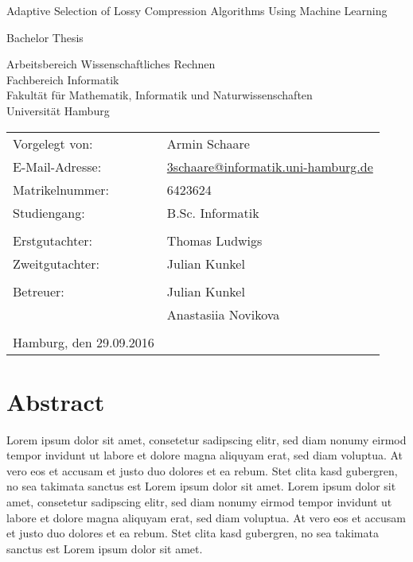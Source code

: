 \documentclass[
	12pt,
	a4paper,
	BCOR10mm,
	DIV14,
	headsepline,
]{scrreprt}
\begin{document}
\begin{titlepage}
	\begin{center}
		{\titlefont\huge Adaptive Selection of Lossy Compression Algorithms Using Machine Learning\par}

		\bigskip
		\bigskip

		{\Large Bachelor Thesis\par}

		\bigskip
		\bigskip

		{\large Arbeitsbereich Wissenschaftliches Rechnen\\
		Fachbereich Informatik\\
		Fakultät für Mathematik, Informatik und Naturwissenschaften\\
		Universität Hamburg\par}
	\end{center}

	\vfill

	{\large\begin{tabular}{ll}
		Vorgelegt von:  & Armin Schaare \\
		E-Mail-Adresse: & \href{mailto:3schaare@informatik.uni-hamburg.de}{3schaare@informatik.uni-hamburg.de} \\
		Matrikelnummer: & 6423624 \\
		Studiengang:    & B.Sc. Informatik \\
		\\
		Erstgutachter:  & Thomas Ludwigs \\
		Zweitgutachter: & Julian Kunkel \\ \\
		Betreuer:       & Julian Kunkel \\
						& Anastasiia Novikova \\
		\\
		Hamburg, den 29.09.2016
	\end{tabular}\par}
\end{titlepage}

\chapter*{Abstract}

\thispagestyle{empty}

Lorem ipsum dolor sit amet, consetetur sadipscing elitr, sed diam nonumy eirmod tempor invidunt ut labore et dolore magna aliquyam erat, sed diam voluptua.
At vero eos et accusam et justo duo dolores et ea rebum.
Stet clita kasd gubergren, no sea takimata sanctus est Lorem ipsum dolor sit amet.
Lorem ipsum dolor sit amet, consetetur sadipscing elitr, sed diam nonumy eirmod tempor invidunt ut labore et dolore magna aliquyam erat, sed diam voluptua.
At vero eos et accusam et justo duo dolores et ea rebum.
Stet clita kasd gubergren, no sea takimata sanctus est Lorem ipsum dolor sit amet.
\end{document}
